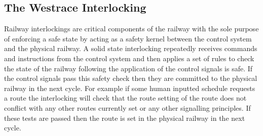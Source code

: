 \begin{comment}
The one aspect signal is typically a fixed red indicating that is not possible
to proceed down the track at this current point in time. The two - four aspect
signals are used on tracks with different speeds to convey different stopping
distances.  The two aspect signal for instance would be used on a low speed
track segment where stopping distances are relatively short. Whereas the four
aspect signal would be used on a high speed line where stopping distances are
long and the driver needs information for a greater length of track. These
signalling schemes are fixed in the UK however they are not fixed from country
to country. On the continent, for example, they may use different conventions,
colours and number of lights on each signal.
\end{comment}



\subsection{The Westrace Interlocking}

Railway interlockings are critical components of the railway with the sole purpose of enforcing a safe state by acting as a safety kernel between the control system and the physical railway. A solid state interlocking repeatedly receives commands and instructions from the control system and then applies a set of rules to check the state of the railway following the application of the control signals is safe. If the control signals pass this safety check then they are committed to the physical railway in the next cycle. For example if some human inputted schedule requests a route the interlocking will check that the route setting of the route does not conflict with any other routes currently set or any other signalling principles. If these tests are passed then the route  is set in the physical railway in the next cycle.

\begin{comment}
The railway interlocking is a key component in ensuring the safety of the
railway. Its job is to apply a set of rules to the requests and commands it receives from the
control system and check whether or not the future state of the railway is safe.
If the control signals it receives do not violate the safety of the railway
then these signals are committed to the physical infrastructure. For example if
the human controller requests for a route to be set the interlocking will
process this request and ensure that it does not conflict with other routes
before allowing the command to be passed to the physical railway.
\end{comment}


